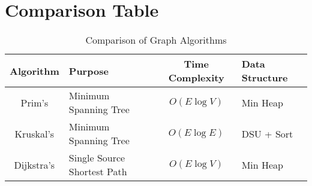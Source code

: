 \documentclass[a4paper,14pt]{extarticle}
\renewcommand{\arraystretch}{1.3}
\begin{document}

\newpage
\section*{Comparison Table}

\begin{table}[h!]
\renewcommand{\arraystretch}{1.4}
\begin{tabularx}{\textwidth}{|c|Y|c|Y|}
\hline
\textbf{Algorithm} & \textbf{Purpose} & \textbf{Time Complexity} & \textbf{Data Structure} \\
\hline
Prim's     & Minimum Spanning Tree         & \(O(E \log V)\) & Min Heap \\
Kruskal's  & Minimum Spanning Tree         & \(O(E \log E)\) & DSU + Sort \\
Dijkstra's & Single Source Shortest Path   & \(O(E \log V)\) & Min Heap \\
\hline
\end{tabularx}
\caption{Comparison of Graph Algorithms}
\end{table}

\newpage
\end{document}
